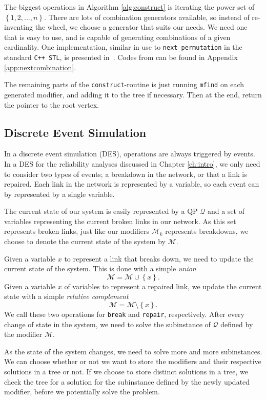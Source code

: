 The biggest operations in Algorithm \ref{alg:construct} is iterating the power
set of $\left\{1,2,\ldots,n\right\}$. There are lots of combination generators available, so
instead of re-inventing the wheel, we choose a generator that suits our needs.
We need one that is easy to use, and is capable of generating combinations of
a given cardinality. One implementation, similar in use to
\texttt{next\_permutation} in the standard \texttt{C++ STL}, is presented
in~\cite{codeproject}.
Codes from \cite{codeproject} can be found in Appendix
\ref{app:nextcombination}.

The remaining parts of the \texttt{construct}-routine is just running
\texttt{mfind} on each generated modifier, and adding it to the tree
if necessary. Then at the end, return the pointer to the root vertex.

\subsection{Discrete Event Simulation}
In a discrete event simulation (DES), operations are always triggered by events.
In a DES for the reliability analyses discussed in Chapter \ref{ch:intro},
we only need to consider two types of events; a breakdown in the network,
or that a link is repaired.
Each link in the network is represented by
a variable, so each event can by represented by a single variable.

The current state of our system is easily represented by a QP $\mathcal{Q}$ and
a set of variables representing the current broken links in our network.
As this set represents broken links, just like our modifiers $\mathcal{M}_k$
represents breakdowns, we choose to denote the current state of the system
by $\mathcal{M}$. 

Given a variable $x$ to represent a link that breaks down, we need to
update the  current state of the system. This is done with a simple
\textit{union}
\[
\mathcal{M} = \mathcal{M} \cup \left\{x\right\}.
\]
Given a variable $x$ of variables to represent a repaired link, we update the
current state with a simple \textit{relative complement}
\[
\mathcal{M} = \mathcal{M} \setminus \left\{x\right\}.
\]
We call these two operations for \texttt{break} and \texttt{repair}, respectively.
After every change of state in the system, we need to solve the subinstance
of $\mathcal{Q}$ defined by the modifier $\mathcal{M}$.

As the state of the system changes, we need to solve more and more subinstances.
We can choose whether or not we want to store the modifiers and their respective
solutions in a tree or not. If we choose to store distinct solutions in a tree,
we check the tree for a solution for the subinstance defined by the newly
updated modifier, before we potentially solve the problem.
